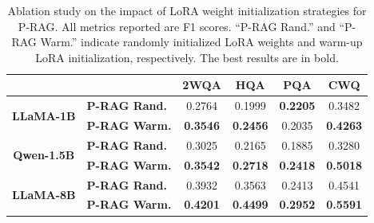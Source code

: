 \documentclass[sigconf,natbib=true,anonymous=false]{acmart}
\begin{document}
\begin{table}
\caption{Ablation study on the impact of LoRA weight initialization strategies for P-RAG. All metrics reported are F1 scores. 
“P-RAG Rand.” and “P-RAG Warm.” indicate randomly initialized LoRA weights and warm-up LoRA initialization, respectively. The best results are in bold.
}

\label{table:init}
\centering
\setlength\tabcolsep{2.5pt}
\begin{tabular}{clcccc}
\toprule
                                    &                       & \textbf{2WQA}   & \textbf{HQA} & \textbf{PQA}  & \textbf{CWQ}     \\
                                    \toprule
\multirow{2}{*}{\textbf{LLaMA-1B}}  %
                                    & \textbf{P-RAG Rand.}  & 0.2764          & 0.1999            & \textbf{0.2205} & 0.3482           \\
                                    & \textbf{P-RAG Warm.} & \textbf{0.3546} & \textbf{0.2456}            & 0.2035          & \textbf{0.4263}  \\
                                    \toprule
\multirow{2}{*}{\textbf{Qwen-1.5B}} %
                                    & \textbf{P-RAG Rand.}  & 0.3025          & 0.2165            & 0.1885          & 0.3280           \\
                                    & \textbf{P-RAG Warm.} & \textbf{0.3542} & \textbf{0.2718}   & \textbf{0.2418} & \textbf{0.5018}  \\
                                    \toprule
\multirow{2}{*}{\textbf{LLaMA-8B}}  %
                                    & \textbf{P-RAG Rand.}  & 0.3932          & 0.3563            & 0.2413          & 0.4541           \\
                                    & \textbf{P-RAG Warm.} & \textbf{0.4201} & \textbf{0.4499}   & \textbf{0.2952} & \textbf{0.5591}  \\
                                    \toprule
\end{tabular}

\end{table}
\end{document}
